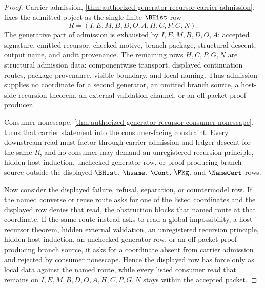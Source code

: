 \begin{proof}
Carrier admission, \autoref{thm:authorized-generator-recursor-carrier-admission}, fixes the admitted object as the single finite $\BHist$ row
$$
R=(I,E,M,B,D,O,A,H,C,P,G,N).
$$
The generative part of admission is exhausted by $I,E,M,B,D,O,A$: accepted signature, emitted recursor, checked motive, branch package, structural descent, output name, and audit provenance. The remaining rows $H,C,P,G,N$ are structural admission data: componentwise transport, displayed continuation routes, package provenance, visible boundary, and local naming. Thus admission supplies no coordinate for a second generator, an omitted branch source, a host-side recursion theorem, an external validation channel, or an off-packet proof producer.

Consumer nonescape, \autoref{thm:authorized-generator-recursor-consumer-nonescape}, turns that carrier statement into the consumer-facing constraint. Every downstream read must factor through carrier admission and ledger descent for the same $R$, and no consumer may demand an unregistered recursion principle, hidden host induction, unchecked generator row, or proof-producing branch source outside the displayed $\BHist$, $\hsame$, $\Cont$, $\Pkg$, and $\NameCert$ rows.

Now consider the displayed failure, refusal, separation, or countermodel row. If the named converse or reuse route asks for one of the listed coordinates and the displayed row denies that read, the obstruction blocks that named route at that coordinate. If the same route instead asks to read a global impossibility, a host recursor theorem, hidden external validation, an unregistered recursion principle, hidden host induction, an unchecked generator row, or an off-packet proof-producing branch source, it asks for a coordinate absent from carrier admission and rejected by consumer nonescape. Hence the displayed row has force only as local data against the named route, while every listed consumer read that remains on $I,E,M,B,D,O,A,H,C,P,G,N$ stays within the accepted packet.
\end{proof}
